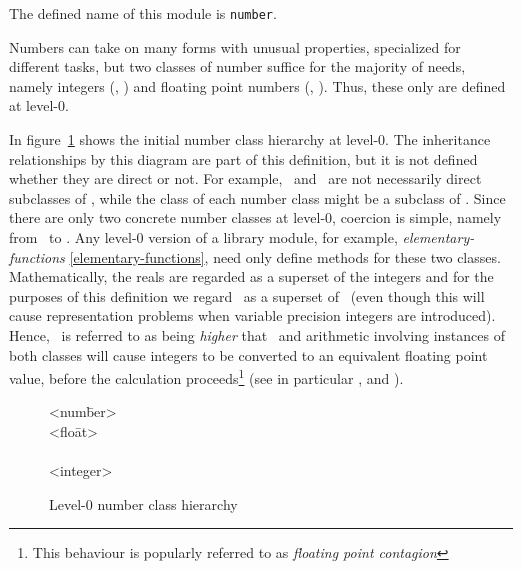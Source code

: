 \begin{optDefinition}
\noindent
The defined name of this module is {\tt number}.

Numbers can take on many forms with unusual properties, specialized for
different tasks, but two classes of number suffice for the majority of needs,
namely integers (, ) and floating point numbers
(, ).  Thus, these only are defined at
level-0.

In figure~\ref{level-0-number-class-hierarchy} shows the initial number class
hierarchy at level-0.  The inheritance relationships by this diagram are part of
this definition, but it is not defined whether they are direct or not.  For
example, \ and \ are not necessarily direct
subclasses of , while the class of each number class might be a
subclass of .  Since there are only two concrete number
classes at level-0,
coercion is simple,
namely from \ to .  Any
level-0 version of a library module, for example, {\em elementary-functions}
\ref{elementary-functions}, need only define methods for these two classes.
Mathematically, the reals are regarded as a superset of the integers and for the
purposes of this definition we regard \ as a superset of
\ (even though this will cause representation problems when
variable precision integers are introduced).  Hence, \ is
referred to as being {\em higher} that \ and arithmetic
involving instances of both classes will cause integers to be converted to an
equivalent floating point value, before the calculation proceeds\footnote{This
    behaviour is popularly referred to as {\em floating point contagion}} (see
in particular ,
 and ).

\begin{figure}[h]
\caption{Level-0 number class hierarchy}
\label{level-0-number-class-hierarchy}
\begin{center}
{\tt\begin{tabbing}
<num\=ber> \\
    \><flo\=at> \\
    \>     \\
    \><integer> \\
    \>    
\end{tabbing}}
\end{center}
\end{figure}


\end{optDefinition}
